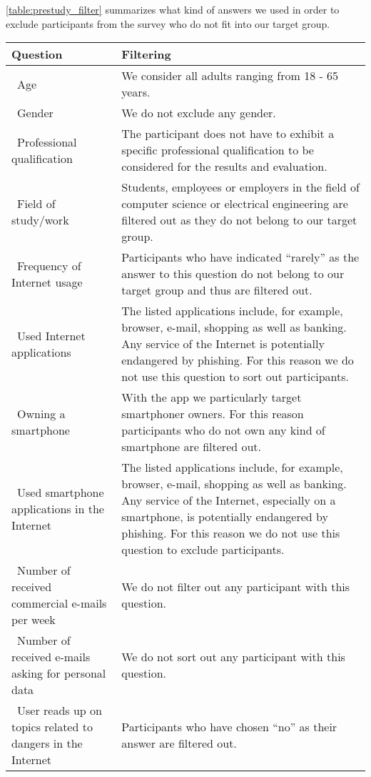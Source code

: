 \autoref{table:prestudy_filter} summarizes what kind of answers we used in order to exclude participants from the survey who do not fit into our target group.
\begin{table}[hHtbp]
\centering
    \begin{tabular}{ | p{4.5cm} | p{10cm} |}
    \hline\textbf{Question} & \textbf{Filtering}  \\  \hline
		\hline\  Age & We consider all adults ranging from 18 - 65 years.
 \\
    \hline\  Gender & We do not exclude any gender.
 \\ 
    \hline\  Professional qualification & The participant does not have to exhibit a specific professional qualification to be considered for the results and evaluation.
 \\ 
		\hline\  Field of study/work & Students, employees or employers in the field of computer science or electrical engineering are filtered out as they do not belong to our target group.
 \\ 
	  \hline\ Frequency of Internet usage & Participants who have indicated ``rarely'' as the answer to this question do not belong to our target group and thus are filtered out.
 \\ 
	  \hline\ Used Internet applications  &  The listed applications include, for example, browser, e-mail, shopping as well as banking.
 Any service of the Internet is potentially endangered by phishing.
 For this reason we do not use this question to sort out participants.
\\ 
    \hline\ Owning a smartphone  & With the app we particularly target smartphoner owners.
 For this reason participants who do not own any kind of smartphone are filtered out.
 \\
		\hline\ Used smartphone applications in the Internet  & The listed applications include, for example, browser, e-mail, shopping as well as banking.
 Any service of the Internet, especially on a smartphone, is potentially endangered by phishing.
 For this reason we do not use this question to exclude participants.
 \\
    \hline\ Number of received commercial e-mails per week  & We do not filter out any participant with this question.
 \\
    \hline\ Number of received e-mails asking for personal data  & We do not sort out any participant with this question.
 \\
    \hline\ User reads up on topics related to dangers in the Internet  &  Participants who have chosen ``no'' as their answer are filtered out.

\end{tabular}
\end{table}
